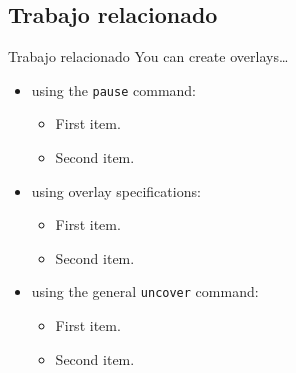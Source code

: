 \subsection{Trabajo relacionado}

\begin{frame}{Trabajo relacionado}
  You can create overlays\dots
  \begin{itemize}
  \item using the \texttt{pause} command:
    \begin{itemize}
    \item
      First item.
    \item    
      Second item.
    \end{itemize}
  \item
    using overlay specifications:
    \begin{itemize}
    \item
      First item.
    \item
      Second item.
    \end{itemize}
  \item
    using the general \texttt{uncover} command:
    \begin{itemize}
      \item
        First item.
      \item
        Second item.
    \end{itemize}
  \end{itemize}
\end{frame}
